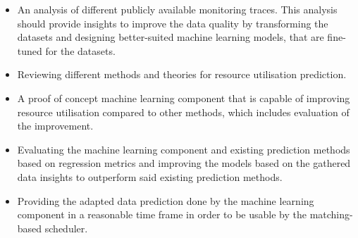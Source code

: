             \begin{itemize}
                \item An analysis of different publicly available monitoring traces. This analysis should provide insights to improve the data quality by transforming the datasets and designing better-suited machine learning models, that are fine-tuned for the datasets.
                
                \item Reviewing different methods and theories for resource utilisation prediction. 
                \item A proof of concept machine learning component that is capable of improving resource utilisation compared to other methods, which includes evaluation of the improvement. 
                \item Evaluating the machine learning component and existing prediction methods based on regression metrics and improving the models based on the gathered data insights to outperform said existing prediction methods.
                \item Providing the adapted data prediction done by the machine learning component in a reasonable time frame in order to be usable by the matching-based scheduler. 
                
            \end{itemize}

                
                
